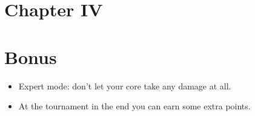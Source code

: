 \documentclass[12pt]{article}
\begin{document}
\newpage

\section*{\LARGE Chapter IV}
\section*{\LARGE Bonus}

\begin{itemize}
  \item Expert mode: don't let your core take any damage at all.
  \item At the tournament in the end you can earn some extra points.
\end{itemize}
\end{document}
